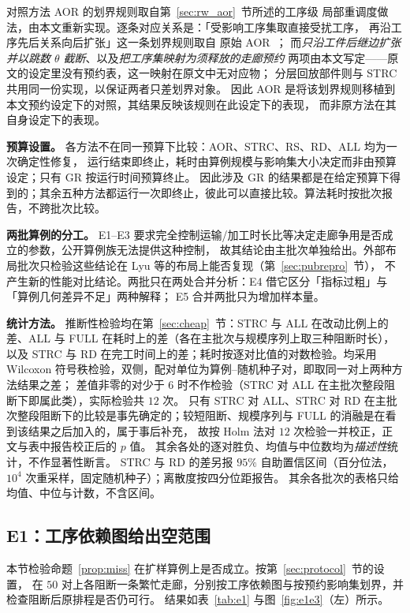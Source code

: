 \documentclass[manuscript,screen,review]{acmart}
\providecommand{\STRC}{\textsc{STRC}}
\newcommand{\NPairs}{50}
\begin{document}
对照方法 AOR 的划界规则取自第~\ref{sec:rw_aor}~节所述的工序级
局部重调度做法，由本文重新实现。逐条对应关系是：「受影响工序集取直接受扰工序，
再沿工序先后关系向后扩张」这一条划界规则取自
原始 AOR~\cite{subramaniam2003maor}；
而\emph{只沿工件后继边扩张并以跳数 \(\theta\) 截断}、以及\emph{把工序集映射为须释放的走廊预约}
两项由本文写定——原文的设定里没有预约表，这一映射在原文中无对应物；
分层回放部件则与 \STRC{} 共用同一份实现，以保证两者只差划界对象。
因此 AOR 是将该划界规则移植到本文预约设定下的对照，其结果反映该规则在此设定下的表现，
而非原方法在其自身设定下的表现。

\textbf{预算设置。}
各方法不在同一预算下比较：AOR、\STRC{}、RS、RD、ALL 均为一次确定性修复，
运行结束即终止，耗时由算例规模与影响集大小决定而非由预算设定；只有 GR 按运行时间预算终止。
因此涉及 GR 的结果都是在给定预算下得到的；其余五种方法都运行一次即终止，彼此可以直接比较。算法耗时按批次报告，不跨批次比较。

\textbf{两批算例的分工。}
E1--E3 要求完全控制运输/加工时长比等决定走廊争用是否成立的参数，公开算例族无法提供这种控制，
故其结论由主批次单独给出。外部布局批次只检验这些结论在 Lyu 等的布局上能否复现（第~\ref{sec:pubrepro}~节），
不产生新的性能对比结论。两批只在两处合并分析：E4 借它区分「指标过粗」与「算例几何差异不足」两种解释；
E5 合并两批只为增加样本量。

\textbf{统计方法。}
推断性检验均在第~\ref{sec:cheap}~节：\STRC{} 与 ALL 在改动比例上的差、ALL 与 FULL 在耗时上的差（各在主批次与规模序列上取三种阻断时长），
以及 \STRC{} 与 RD 在完工时间上的差；耗时按逐对比值的对数检验。均采用 Wilcoxon 符号秩检验，双侧，配对单位为算例--随机种子对，即取同一对上两种方法结果之差；
差值非零的对少于 \(6\) 时不作检验（\STRC{} 对 ALL 在主批次整段阻断下即属此类），实际检验共 \(12\) 次。
只有 \STRC{} 对 ALL、\STRC{} 对 RD 在主批次整段阻断下的比较是事先确定的；较短阻断、规模序列与 FULL 的消融是在看到该结果之后加入的，属于事后补充，
故按 Holm 法对 \(12\) 次检验一并校正，正文与表中报告校正后的 \(p\) 值。
其余各处的逐对胜负、均值与中位数均为\emph{描述性}统计，不作显著性断言。
\STRC{} 与 RD 的差另报 \(95\%\) 自助置信区间（百分位法，\(10^4\) 次重采样，固定随机种子）；离散度按四分位距报告。
其余各批次的表格只给均值、中位与计数，不含区间。

\subsection{E1：工序依赖图给出空范围}
\label{sec:e1}

本节检验命题~\ref{prop:miss} 在扩样算例上是否成立。按第~\ref{sec:protocol}~节的设置，
在 \(\NPairs\) 对上各阻断一条繁忙走廊，分别按工序依赖图与按预约影响集划界，并检查阻断后原排程是否仍可行。
结果如表~\ref{tab:e1} 与图~\ref{fig:e1e3}（左）所示。
\end{document}

